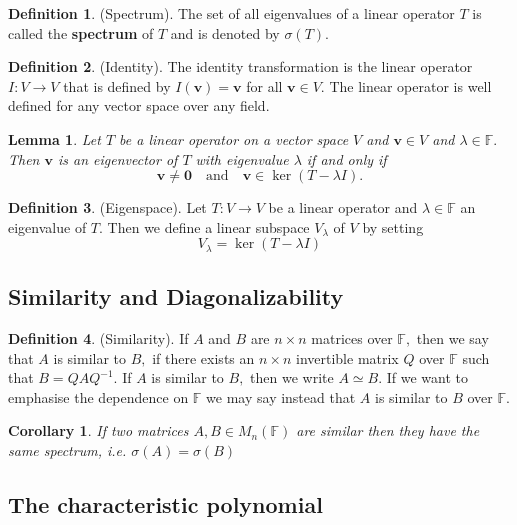 \documentclass[12pt, a4paper]{article}
\newcommand{\bb}[1]{\mathbb{#1}}
\theoremstyle{definition}
\newtheorem{definition}{Definition}[section]
\theoremstyle{plain}
\newtheorem{corollary}{Corollary}[theorem]
\newtheorem{lemma}[theorem]{Lemma}
\begin{document}
\begin{definition}
(Spectrum). The set of all eigenvalues of a linear operator $T$ is called the \textbf{spectrum} of $T$ and is denoted by $\sigma{(T)}.$
\end{definition}

\begin{definition}
(Identity). The identity transformation is the linear operator $I:V\rightarrow V$ that is defined by $I(\mathbf{v})=\mathbf{v}$ for all $\mathbf{v} \in V.$ The linear operator is well defined for any vector space over any field.

\end{definition}

\begin{lemma}
Let $T$ be a linear operator on a vector space $V$ and $\mathbf{v} \in V$ and $\lambda \in \bb{F}.$ Then $\mathbf{v}$ is an eigenvector of $T$ with eigenvalue $\lambda$ if and only if $$\mathbf{v} \neq \mathbf{0} \quad \text{and} \quad \mathbf{v} \in \ker{(T-\lambda I)}.$$
\end{lemma}

\begin{definition}
(Eigenspace). Let $T:V\rightarrow V$ be a linear operator and $\lambda \in \bb{F}$ an eigenvalue of $T.$ Then we define a linear subspace $V_\lambda$ of $V$ by setting $$V_\lambda = \ker{(T-\lambda I)}$$
\end{definition}

\subsection{Similarity and Diagonalizability}

\begin{definition}
(Similarity). If $A$ and $B$ are $n \times n$ matrices over $\bb{F},$ then we say that $A$ is similar to $B,$ if there exists an $n \times n$ invertible matrix $Q$ over $\bb{F}$ such that $B=QAQ^{-1}.$ If $A$ is similar to $B,$ then we write $A\simeq B.$ If we want to emphasise the dependence on $\bb{F}$ we may say instead that $A$ is similar to $B$ over $\bb{F}.$
\end{definition}

\begin{corollary}
If two matrices $A,B \in M_n(\bb{F})$ are similar then they have the same spectrum, i.e. $\sigma(A)=\sigma(B)$
\end{corollary}

\subsection{The characteristic polynomial}
\end{document}

